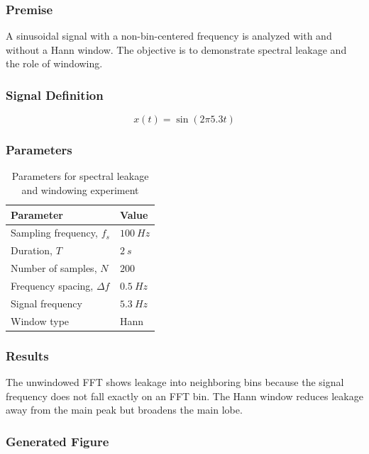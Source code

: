 \documentclass[11pt,a4paper]{article}
\begin{document}
\subsubsection{Premise}

A sinusoidal signal with a non-bin-centered frequency is analyzed with and without a Hann window. The objective is to demonstrate spectral leakage and the role of windowing.

\subsubsection{Signal Definition}

\begin{equation}
    x(t) =
    \sin(2\pi 5.3t)
\end{equation}

\subsubsection{Parameters}

\begin{table}[H]
\centering
\caption{Parameters for spectral leakage and windowing experiment}
\begin{tabular}{ll}
\toprule
Parameter & Value \\
\midrule
Sampling frequency, \(f_s\) & \(100\ \si{Hz}\) \\
Duration, \(T\) & \(2\ \si{s}\) \\
Number of samples, \(N\) & \(200\) \\
Frequency spacing, \(\Delta f\) & \(0.5\ \si{Hz}\) \\
Signal frequency & \(5.3\ \si{Hz}\) \\
Window type & Hann \\
\bottomrule
\end{tabular}
\end{table}

\subsubsection{Results}

The unwindowed FFT shows leakage into neighboring bins because the signal frequency does not fall exactly on an FFT bin. The Hann window reduces leakage away from the main peak but broadens the main lobe.

\subsubsection{Generated Figure}
\end{document}
